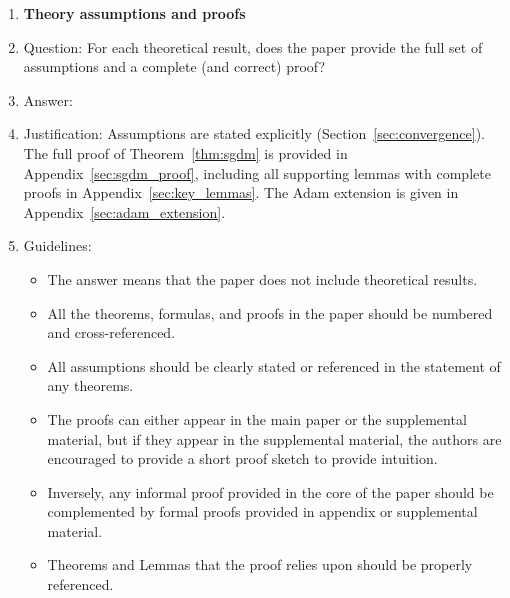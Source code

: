\documentclass{article}
\begin{document}
\begin{enumerate}
\item {\bf Theory assumptions and proofs}
    \item[] Question: For each theoretical result, does the paper provide the full set of assumptions and a complete (and correct) proof?
    \item[] Answer: \answerYes{}
    \item[] Justification: Assumptions are stated explicitly (Section~\ref{sec:convergence}). The full proof of Theorem~\ref{thm:sgdm} is provided in Appendix~\ref{sec:sgdm_proof}, including all supporting lemmas with complete proofs in Appendix~\ref{sec:key_lemmas}. The Adam extension is given in Appendix~\ref{sec:adam_extension}.
    \item[] Guidelines:
    \begin{itemize}
        \item The answer \answerNA{} means that the paper does not include theoretical results. 
        \item All the theorems, formulas, and proofs in the paper should be numbered and cross-referenced.
        \item All assumptions should be clearly stated or referenced in the statement of any theorems.
        \item The proofs can either appear in the main paper or the supplemental material, but if they appear in the supplemental material, the authors are encouraged to provide a short proof sketch to provide intuition. 
        \item Inversely, any informal proof provided in the core of the paper should be complemented by formal proofs provided in appendix or supplemental material.
        \item Theorems and Lemmas that the proof relies upon should be properly referenced. 
    \end{itemize}


\end{enumerate}
\end{document}
